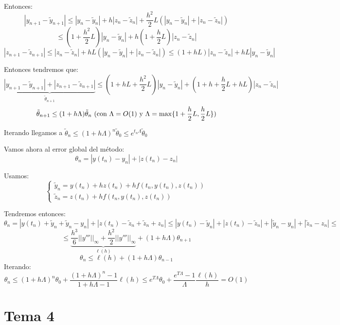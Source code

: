 \documentclass[openany]{book}
\begin{document}
\begin{exercise}
            Entonces:
            $$ |y_{n+1}-\widetilde{y}_{n+1}| \leq |y_n-\widetilde{y}_{n}| + h|z_n-\widetilde{z}_{n}| + \dfrac{h^2}{2}L(|y_n-\widetilde{y}_{n}| + |z_n-\widetilde{z}_{n}|) $$
            $$ \leq (1+\dfrac{h^2}{2}L) |y_n-\widetilde{y}_{n}| +h(1+\dfrac{h}{2}L)|z_n-\widetilde{z}_{n}|  $$
            $$ |z_{n+1}-\widetilde{z}_{n+1}| \leq |z_n-\widetilde{z}_{n}| +hL(|y_n-\widetilde{y}_{n}|+|z_n-\widetilde{z}_{n}|) \leq (1+hL) |z_n-\widetilde{z}_{n}| + hL|y_n-\widetilde{y}_{n}| $$

            Entonces tendremos que:
            $$ \underbrace{|y_{n+1}-\widetilde{y}_{n+1}|+|z_{n+1}-\widetilde{z}_{n+1}|}_{\tilde{\theta}_{n+1}} \leq (1+hL+\dfrac{h^2}{2}L) |y_n-\widetilde{y}_{n}| + (1+h+\dfrac{h}{2}L+hL) |z_n-\widetilde{z}_{n}| $$
            $$ \tilde{\theta}_{n+1} \leq (1+h\Lambda) \tilde{\theta}_n\ (\text{con $ \Lambda = O(1) $ y $ \Lambda = \max\{1+\dfrac{h}{2}L,\dfrac{h}{2}L\} $}) $$

            Iterando llegamos a $ \tilde{\theta}_{n} \leq (1+h\Lambda)^{n}\tilde{\theta}_{0} \leq e^{t_n \Lambda}\tilde{\theta}_{0} $

        Vamos ahora al error global del método:
        $$ \theta_{n} = |y(t_n)-y_n| + |z(t_n)-z_n| $$
        
        Usamos:
        $$ \left\{
        \begin{array}{l}
            \widetilde{y}_{n} = y(t_n)+hz(t_n)+hf(t_n,y(t_n),z(t_n)) \\
            \widetilde{z}_{n} = z(t_n) + hf(t_n,y(t_n),z(t_n))
        \end{array}
        \right. $$

        Tendremos entonces:
        $$ \theta_{n} = |y(t_n)+\widetilde{y}_{n}+\widetilde{y}_{n}-y_n| + |z(t_n)-\widetilde{z}_{n}+\widetilde{z}_{n}+z_n| \leq |y(t_n)-\widetilde{y}_{n}|+|z(t_n)-\widetilde{z}_{n}| + |\widetilde{y}_{n}-y_n| + |\widetilde{z}_{n}-z_n| \leq $$
        $$\leq\underbrace{\dfrac{h^3}{6}||y'''||_{\infty}+ \dfrac{h^2}{2}||y'''||_{\infty}}_{\ell(h)}  + (1+h\Lambda)\theta_{n+1}$$
        $$ \theta_{n} \leq \ell(h) + (1+h\Lambda)\theta_{n-1} $$
        Iterando:
        $$ \theta_{n} \leq (1+h\Lambda)^{n}\theta_{0} + \dfrac{(1+h\Lambda)^{n}-1}{1+h\Lambda -1}\ell(h) \leq e^{T\Lambda}\theta_{0}+ \dfrac{e^{T\Lambda}-1}{\Lambda} \dfrac{\ell(h)}{h} = O(1) $$

    \end{exercise}


    \chapter{Tema 4}
\end{document}
